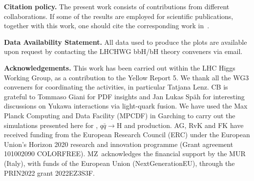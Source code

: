 \documentclass[11pt,a4paper]{article}
\begin{document}

\textbf{Citation policy. }The present work consists of contributions from different collaborations. If some of the results are employed for scientific publications, together with this work, one should cite the corresponding work in~.

\textbf{Data Availability Statement.} All data used to produce the plots are available upon request by contacting the LHCHWG bbH/bH theory conveners via email.

\textbf{Acknowledgements. }This work has been carried out within the LHC Higgs Working Group, as a contribution to the Yellow Report 5. We thank all the WG3 conveners for coordinating the activities, in particular Tatjana Lenz. CB is grateful to Tommaso Giani for PDF insights and Jan Lukas Sp\"ah for interesting discussions on Yukawa interactions via light-quark fusion. We have used the Max Planck Computing and Data Facility (MPCDF) in Garching to carry out the \minnlo{} simulations presented here for \bbtoH{}, $q\bar q\rightarrow \text{H}$ and \bbH{} production. 
AG, RvK and FK have received funding from the European Research Council (ERC) under the European Union's Horizon 2020 research and innovation programme (Grant agreement 101002090 COLORFREE).
MZ~acknowledges the financial support by the MUR (Italy), with
funds of the European Union (NextGenerationEU), through the PRIN2022
grant 2022EZ3S3F.



\end{document}
